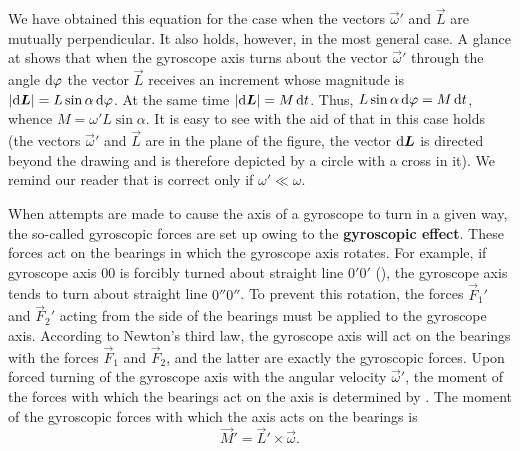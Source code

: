 \noindent
We have obtained this equation for the case when the vectors $\vec{\omega}'$ and $\vec{L}$ are mutually perpendicular. It also holds, however, in the most general case. A glance at  shows that when the gyroscope axis turns about the vector $\vec{\omega}'$ through the angle $\mathrm{d}\varphi$ the vector $\vec{L}$ receives an increment whose magnitude is $|\mathrm{d}\boldsymbol{L}|=L\sin\alpha\,\mathrm{d}\varphi$. At the same time $|\mathrm{d}\boldsymbol{L}|=M\,\mathrm{d} t$. Thus, $L\sin\alpha\,\mathrm{d}\varphi=M\,\mathrm{d} t$, whence $M=\omega'L\sin\alpha$. It is easy to see with the aid of  that in this case  holds (the vectors $\vec{\omega}'$ and $\vec{L}$ are in the plane of the figure, the vector $\mathrm{d}\boldsymbol{L}$ is directed beyond the drawing and is therefore depicted by a circle with a cross in it). We remind our reader that  is correct only if $\omega'\ll\omega$.

When attempts are made to cause the axis of a gyroscope to turn in a given way, the so-called gyroscopic forces are set up owing to the \textbf{gyroscopic effect}. These forces act on the bearings in which the gyroscope axis rotates. For example, if gyroscope axis $00$ is forcibly turned about straight line $0'0'$ (), the gyroscope axis tends to turn about straight line $0''0''$. To prevent this rotation, the forces $\vec{F}_1'$ and $\vec{F}_2'$ acting from the side of the bearings must be applied to the gyroscope axis. According to Newton's third law, the gyroscope axis will act on the bearings with the forces $\vec{F}_1$ and $\vec{F}_2$, and the latter are exactly the gyroscopic forces. Upon forced turning of the gyroscope axis with the angular velocity $\vec{\omega}'$, the moment of the forces with which the bearings act on the axis is determined by . The moment of the gyroscopic forces with which the axis acts on the bearings is
\begin{equation}\label{eq:5_70}
	\vec{M}' = \vec{L}' \times \vec{\omega}.
\end{equation}


